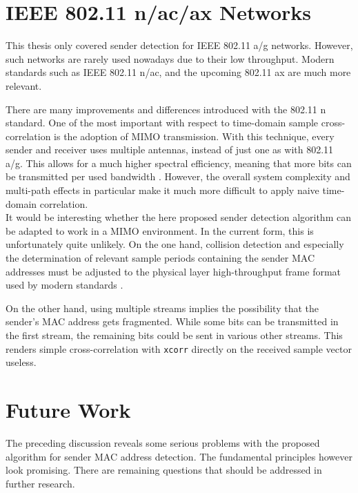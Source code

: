 
\section{IEEE 802.11 n/ac/ax Networks}\label{sec:mimo}

This thesis only covered sender detection for IEEE 802.11 a/g networks. However, such networks are rarely used nowadays due to their low throughput. Modern standards such as IEEE 802.11 n/ac, and the upcoming 802.11 ax are much more relevant.

There are many improvements and differences introduced with the 802.11 n standard. One of the most important with respect to time-domain sample cross-correlation is the adoption of \gls{MIMO} transmission. With this technique, every sender and receiver uses multiple antennas, instead of just one as with 802.11 a/g. This allows for a much higher spectral efficiency, meaning that more bits can be transmitted per used bandwidth \cite{perahia2013}. However, the overall system complexity and multi-path effects in particular make it much more difficult to apply naive time-domain correlation.\\

It would be interesting whether the here proposed sender detection algorithm can be adapted to work in a \gls{MIMO} environment. In the current form, this is unfortunately quite unlikely. On the one hand, collision detection and especially the determination of relevant sample periods containing the sender \gls{MAC} addresses must be adjusted to the physical layer high-throughput frame format used by modern standards \cite{ieee2012}.

On the other hand, using multiple streams implies the possibility that the sender's \gls{MAC} address gets fragmented. While some bits can be transmitted in the first stream, the remaining bits could be sent in various other streams. This renders simple cross-correlation with \texttt{xcorr} directly on the received sample vector useless.



\section{Future Work}

The preceding discussion reveals some serious problems with the proposed algorithm for sender \gls{MAC} address detection. The fundamental principles however look promising. There are remaining questions that should be addressed in further research.\\

